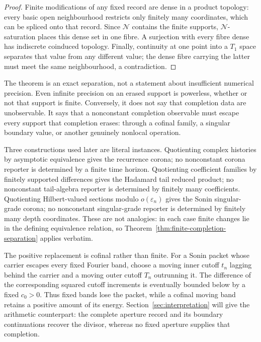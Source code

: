 \documentclass[11pt]{article}
\theoremstyle{definition}
\theoremstyle{remark}
\begin{document}
\begin{proof}
Finite modifications of any fixed record are dense in a product topology: every basic open
neighbourhood restricts only finitely many coordinates, which can be spliced onto that record.
Since $\mathcal N$ contains the finite supports, $\mathcal N$-saturation places this dense set in
one fibre.  A surjection with every fibre dense has indiscrete coinduced topology.  Finally,
continuity at one point into a $T_1$ space
separates that value from any different value; the dense fibre carrying the latter must meet the
same neighbourhood, a contradiction.
\end{proof}

The theorem is an exact separation, not a statement about insufficient numerical precision.
Even infinite precision on an erased support is powerless, whether or not that support is finite.
Conversely, it does not say that completion data are unobservable.  It says that a nonconstant
completion observable must escape every support that completion erases: through a cofinal family,
a singular boundary value, or another genuinely nonlocal operation.

Three constructions used later are literal instances.  Quotienting complex histories by
asymptotic equivalence gives the recurrence corona; no nonconstant corona reporter is determined
by a finite time horizon.  Quotienting coefficient families by finitely supported differences
gives the Hadamard tail reduced product; no nonconstant tail-algebra reporter is determined by
finitely many coefficients.  Quotienting Hilbert-valued sections modulo $o(\varepsilon_n)$ gives
the Sonin singular-grade corona; no nonconstant singular-grade reporter is determined by finitely
many depth coordinates.  These are not analogies: in each case finite changes lie in the defining
equivalence relation, so Theorem~\ref{thm:finite-completion-separation} applies verbatim.

The positive replacement is cofinal rather than finite.  For a Sonin packet whose carrier escapes
every fixed Fourier band, choose a moving inner cutoff $t_n$ lagging behind the carrier and a
moving outer cutoff $T_n$ outrunning it.  The difference of the corresponding squared cutoff
increments is eventually bounded below by a fixed $c_0>0$.  Thus fixed bands lose the packet,
while a cofinal moving band retains a positive amount of its energy.  Section~\ref{sec:interpretation}
will give the arithmetic counterpart: the complete aperture record and its boundary continuations
recover the divisor, whereas no fixed aperture supplies that completion.
\end{document}
